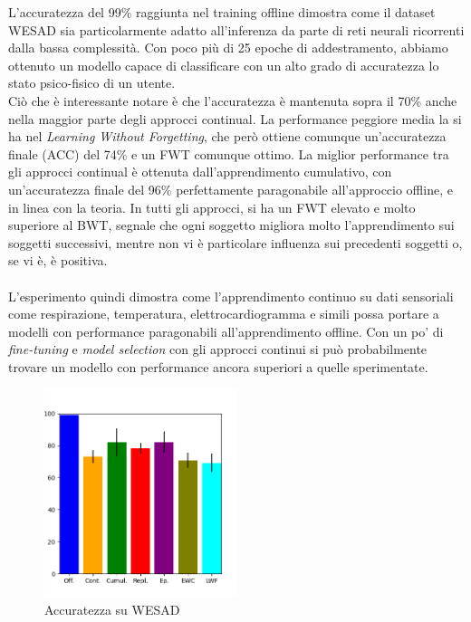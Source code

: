 L'accuratezza del 99\% raggiunta nel training offline dimostra come il dataset WESAD sia particolarmente adatto all'inferenza da parte di reti neurali ricorrenti dalla bassa complessità. Con poco più di 25 epoche di addestramento, abbiamo ottenuto un modello capace di classificare con un alto grado di accuratezza lo stato psico-fisico di un utente.\\
Ciò che è interessante notare è che l'accuratezza è mantenuta sopra il 70\% anche nella maggior parte degli approcci continual. La performance peggiore media la si ha nel \textit{Learning Without Forgetting}, che però ottiene comunque un'accuratezza finale (ACC) del 74\% e un FWT comunque ottimo. La miglior performance tra gli approcci continual è ottenuta dall'apprendimento cumulativo, con un'accuratezza finale del 96\% perfettamente paragonabile all'approccio offline, e in linea con la teoria. In tutti gli approcci, si ha un FWT elevato e molto superiore al BWT, segnale che ogni soggetto migliora molto l'apprendimento sui soggetti successivi, mentre non vi è particolare influenza sui precedenti soggetti o, se vi è, è positiva.\\\\
L'esperimento quindi dimostra come l'apprendimento continuo su dati sensoriali come respirazione, temperatura, elettrocardiogramma e simili possa portare a modelli con performance paragonabili all'apprendimento offline. Con un po' di \textit{fine-tuning} e \textit{model selection} con gli approcci continui si può probabilmente trovare un modello con performance ancora superiori a quelle sperimentate.
\begin{figure}[h]
	\begin{center}
		\includegraphics[width=0.5\textwidth]{img/graphs/wesad_final_accuracy.png}
		\caption{Accuratezza su WESAD}
		\label{fig:wesad_accuracy_graph}
	\end{center}
\end{figure}
\pagebreak

